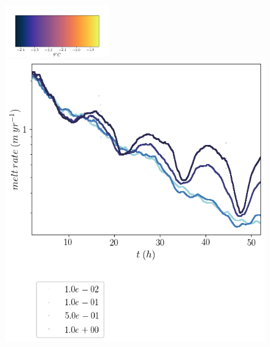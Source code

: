\documentclass[draft]{agujournal2019}
\begin{document}
\begin{figure}[h!]
\begin{minipage}{0.4\textwidth}
    \end{minipage}
    \includegraphics[width=0.4\textwidth,trim={1cm 0cm 1cm 5cm}, clip]{Figures/colorbar_thermal_driving.png}
    \begin{minipage}{0.4\textwidth}
        \includegraphics[trim={0 4cm 0 0},clip,width=\textwidth]{Figures/melt_cmp_dslope_t.png}
    \end{minipage}%
    \begin{minipage}{0.4\textwidth}

\end{minipage}
\end{figure}
\end{document}
